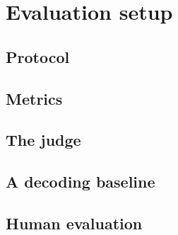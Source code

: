 \chapter{Evaluation setup}\label{ch:eval}

\section{Protocol}

\section{Metrics}

\section{The judge}

\section{A decoding baseline}

\section{Human evaluation}
